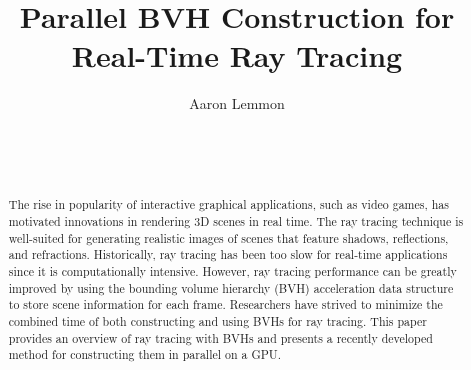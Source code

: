 \documentclass{sig-alternate}
\begin{document}

\title{Parallel BVH Construction for Real-Time Ray Tracing}


\author{
\alignauthor
Aaron Lemmon\\
	\\
	\\
	\\
}

\maketitle
\begin{abstract}

The rise in popularity of interactive graphical applications, such as video games, has motivated innovations in rendering 3D scenes in real time. The ray tracing technique is well-suited for generating realistic images of scenes that feature shadows, reflections, and refractions. Historically, ray tracing has been too slow for real-time applications since it is computationally intensive. However, ray tracing performance can be greatly improved by using the bounding volume hierarchy (BVH) acceleration data structure to store scene information for each frame. Researchers have strived to minimize the combined time of both constructing and using BVHs for ray tracing. This paper provides an overview of ray tracing with BVHs and presents a recently developed method for constructing them in parallel on a GPU.
	
\end{abstract}

\end{document}
